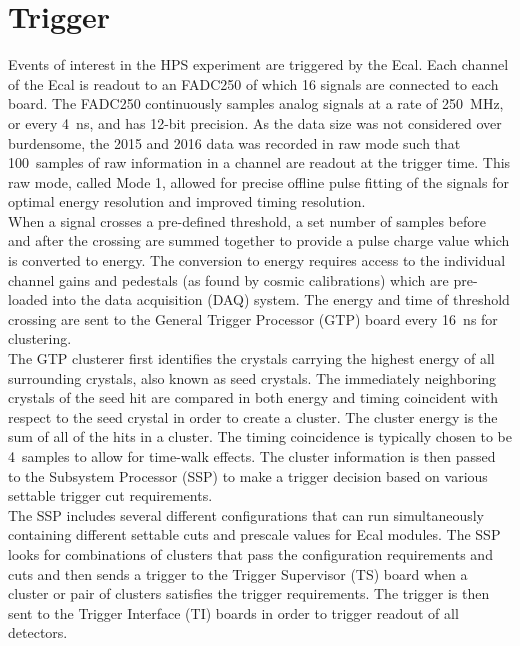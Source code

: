 \documentclass[12pt]{report}
\begin{document}
\section{Trigger}

Events of interest in the HPS experiment are triggered by the Ecal. Each channel of the Ecal is readout to an FADC250 of which 16 signals are connected to each board. The FADC250 continuously samples analog signals at a rate of 250~MHz, or every 4~ns, and has 12-bit precision. As the data size was not considered over burdensome, the 2015 and 2016 data was recorded in raw mode such that 100~samples of raw information in a channel are readout at the trigger time. This raw mode, called Mode 1, allowed for precise offline pulse fitting of the signals for optimal energy resolution and improved timing resolution.\\
\indent When a signal crosses a pre-defined threshold, a set number of samples before and after the crossing are summed together to provide a pulse charge value which is converted to energy. The conversion to energy requires access to the individual channel gains and pedestals (as found by cosmic calibrations) which are pre-loaded into the data acquisition (DAQ) system. The energy and time of threshold crossing are sent to the General Trigger Processor (GTP) board every 16~ns  for clustering.\\
\indent The GTP clusterer first identifies the crystals carrying the highest energy of all surrounding crystals, also known as seed crystals. The immediately neighboring crystals of the seed hit are compared in both energy and timing coincident with respect to the seed crystal in order to create a cluster. The cluster energy is the sum of all of the hits in a cluster. The timing coincidence is typically chosen to be 4~samples to allow for time-walk effects. The cluster information is then passed to the Subsystem Processor (SSP) to make a trigger decision based on various settable trigger cut requirements. \\
\indent The SSP includes several different configurations that can run simultaneously containing different settable cuts and prescale values for Ecal modules. The SSP looks for combinations of clusters that pass the configuration requirements and cuts and then sends a trigger to the Trigger Supervisor (TS) board when a cluster or pair of clusters satisfies the trigger requirements. The trigger is then sent to the Trigger Interface (TI) boards in order to trigger readout of all detectors.\\ 
\end{document}
